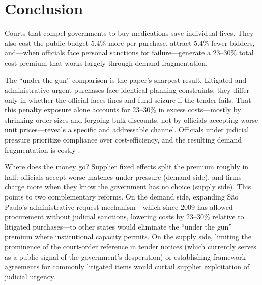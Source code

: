 \section{Conclusion}
\label{sec:conclusion}

Courts that compel governments to buy medications save individual lives. They also cost the public budget 5.4\% more per purchase, attract 5.4\% fewer bidders, and---when officials face personal sanctions for failure---generate a 23--30\% total cost premium that works largely through demand fragmentation.

The ``under the gun'' comparison is the paper's sharpest result. Litigated and administrative urgent purchases face identical planning constraints; they differ only in whether the official faces fines and fund seizure if the tender fails. That this penalty exposure alone accounts for 23--30\% in excess costs---mostly by shrinking order sizes and forgoing bulk discounts, not by officials accepting worse unit prices---reveals a specific and addressable channel. Officials under judicial pressure prioritize compliance over cost-efficiency, and the resulting demand fragmentation is costly \citep{prendergast2007bureaucrats, rasul2018management}.

Where does the money go? Supplier fixed effects split the premium roughly in half: officials accept worse matches under pressure (demand side), and firms charge more when they know the government has no choice (supply side). This points to two complementary reforms. On the demand side, expanding S\~ao Paulo's administrative request mechanism---which since 2009 has allowed procurement without judicial sanctions, lowering costs by 23--30\% relative to litigated purchases---to other states would eliminate the ``under the gun'' premium where institutional capacity permits. On the supply side, limiting the prominence of the court-order reference in tender notices (which currently serves as a public signal of the government's desperation) or establishing framework agreements for commonly litigated items would curtail supplier exploitation of judicial urgency.


